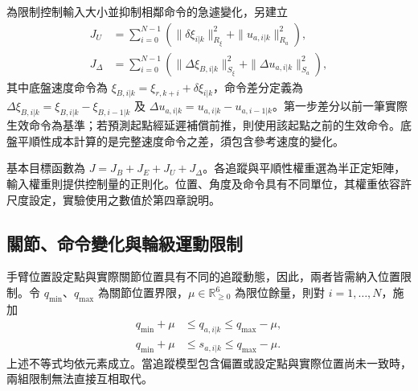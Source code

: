 為限制控制輸入大小並抑制相鄰命令的急遽變化，另建立
\begin{equation}
    \begin{aligned}
        J_U
        &=\sum_{i=0}^{N-1}
          \left(
              \|\delta\xi_{i|k}\|_{R_{\xi}}^{2}
              +\|u_{a,i|k}\|_{R_a}^{2}
          \right), \\
        J_{\Delta}
        &=\sum_{i=0}^{N-1}
          \left(
              \|\Delta\xi_{B,i|k}\|_{S_{\xi}}^{2}
              +\|\Delta u_{a,i|k}\|_{S_a}^{2}
          \right),
    \end{aligned}
    \label{eq:ch3_input_smoothness_cost}
\end{equation}
其中底盤速度命令為 $\xi_{B,i|k}=\xi_{r,k+i}+\delta\xi_{i|k}$，命令差分定義為 $\Delta\xi_{B,i|k}=\xi_{B,i|k}-\xi_{B,i-1|k}$ 及 $\Delta u_{a,i|k}=u_{a,i|k}-u_{a,i-1|k}$。第一步差分以前一筆實際生效命令為基準；若預測起點經延遲補償前推，則使用該起點之前的生效命令。底盤平順性成本計算的是完整速度命令之差，須包含參考速度的變化。

基本目標函數為 $J=J_B+J_E+J_U+J_{\Delta}$。各追蹤與平順性權重選為半正定矩陣，輸入權重則提供控制量的正則化。位置、角度及命令具有不同單位，其權重依容許尺度設定，實驗使用之數值於第四章說明。

\subsection{關節、命令變化與輪級運動限制}
\label{subsec:joint_command_wheel_constraints}

手臂位置設定點與實際關節位置具有不同的追蹤動態，因此，兩者皆需納入位置限制。令 $q_{\min}$、$q_{\max}$ 為關節位置界限，$\mu\in\mathbb{R}_{\geq0}^{6}$ 為限位餘量，則對 $i=1,\ldots,N$，施加
\begin{equation}
    \begin{aligned}
        q_{\min}+\mu
        &\leq q_{a,i|k}\leq q_{\max}-\mu, \\
        q_{\min}+\mu
        &\leq s_{a,i|k}\leq q_{\max}-\mu.
    \end{aligned}
    \label{eq:ch3_joint_setpoint_limits}
\end{equation}
上述不等式均依元素成立。當追蹤模型包含偏置或設定點與實際位置尚未一致時，兩組限制無法直接互相取代。

